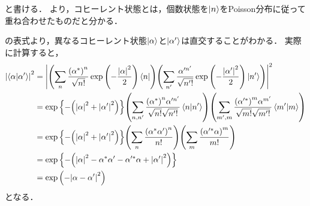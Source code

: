 \documentclass{report}
\begin{document}
    と書ける．
    より，コヒーレント状態とは，個数状態を$\ket{n}$をPoisson分布に従って重ね合わせたものだと分かる．
    \par
    の表式より，異なるコヒーレント状態$\ket{\alpha}$と$\ket{\alpha'}$は直交することがわかる．
    実際に計算すると，
    \begin{align}
      \abs{\braket{\alpha}{\alpha'}}^2 &= \abs{\qty(\sum_n \frac{\qty(\alpha^*)^n}{\sqrt{n!}}\exp\qty(-\frac{\abs{\alpha}^2}{2})\bra{n})\qty(\sum_{n'} \frac{\alpha'^{n'}}{\sqrt{{n'}!}}\exp\qty(-\frac{\abs{\alpha'}^2}{2})\ket{n'})}^2 \\ 
      &= \exp\qty{-\qty(\abs{\alpha}^2 + \abs{\alpha'}^2)}\qty(\sum_{n, n'}\frac{\qty(\alpha^*)^n\alpha'^{n'}}{\sqrt{n!}\sqrt{n'!}}\braket{n}{n'})\qty(\sum_{m', m}\frac{\qty(\alpha'^*)^m\alpha^{m'}}{\sqrt{m!}\sqrt{m'!}}\braket{m'}{m}) \\ 
      &= \exp\qty{-\qty(\abs{\alpha}^2 + \abs{\alpha'}^2)}\qty(\sum_{n}\frac{\qty(\alpha^*\alpha')^n}{n!})\qty(\sum_{m}\frac{\qty(\alpha'^*\alpha)^m}{m!}) \\ 
      &= \exp\qty{-\qty(\abs{\alpha}^2 - \alpha^*\alpha' - \alpha'^*\alpha + \abs{\alpha'}^2)} \\ 
      &= \exp\qty(-\abs{\alpha - \alpha'}^2)
    \end{align}
    となる．
\end{document}
